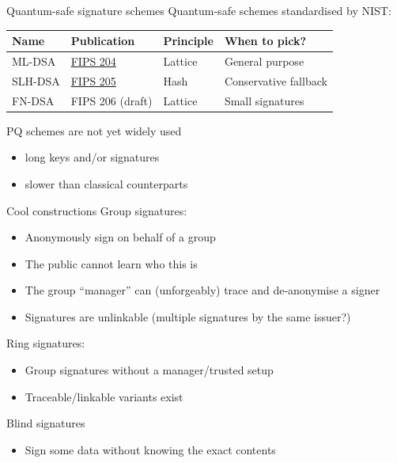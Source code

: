 \begin{frame}{Quantum-safe signature schemes}
  Quantum-safe schemes standardised by NIST:
  \begin{table}
  \small
  \begin{tabular}{@{}llll@{}}
    \toprule
    Name & Publication & Principle & When to pick?\\
    \midrule
    ML-DSA  & \href{https://csrc.nist.gov/pubs/fips/204/final}{FIPS 204} & Lattice & General purpose \\
    SLH-DSA & \href{https://csrc.nist.gov/pubs/fips/205/final}{FIPS 205} & Hash    & Conservative fallback \\
    FN-DSA  & FIPS 206 (draft)                                           & Lattice & Small signatures \\
    \bottomrule
  \end{tabular}
  \end{table}

  \vspace{0.5em}

  \pause
  PQ schemes are not yet widely used
  \begin{itemize}
    \item long keys and/or signatures
    \item slower than classical counterparts
  \end{itemize}
\end{frame}

\begin{frame}{Cool constructions}
  \pause
  Group signatures:
  \begin{itemize}
    \item Anonymously sign on behalf of a group
    \item The public cannot learn who this is
    \item The group \enquote{manager} can (unforgeably) trace and de-anonymise a signer
    \item Signatures are unlinkable (multiple signatures by the same issuer?)
  \end{itemize}

  \pause
  Ring signatures:
  \begin{itemize}
    \item Group signatures without a manager/trusted setup
    \item Traceable/linkable variants exist
  \end{itemize}

  \pause
  Blind signatures
  \begin{itemize}
    \item Sign some data without knowing the exact contents
  \end{itemize}
\end{frame}

